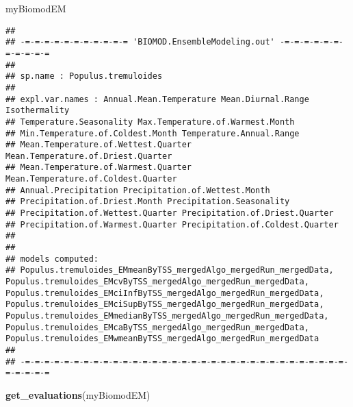 \documentclass[]{article}
\newenvironment{Shaded}{\begin{snugshade}}{\end{snugshade}}
\newcommand{\KeywordTok}[1]{\textcolor[rgb]{0.13,0.29,0.53}{\textbf{#1}}}
\newcommand{\NormalTok}[1]{#1}
\begin{document}
\begin{Shaded}
\begin{Highlighting}[]
\NormalTok{myBiomodEM}
\end{Highlighting}
\end{Shaded}

\begin{verbatim}
## 
## -=-=-=-=-=-=-=-=-=-=-= 'BIOMOD.EnsembleModeling.out' -=-=-=-=-=-=-=-=-=-=-=
## 
## sp.name : Populus.tremuloides
## 
## expl.var.names : Annual.Mean.Temperature Mean.Diurnal.Range Isothermality 
## Temperature.Seasonality Max.Temperature.of.Warmest.Month 
## Min.Temperature.of.Coldest.Month Temperature.Annual.Range 
## Mean.Temperature.of.Wettest.Quarter Mean.Temperature.of.Driest.Quarter 
## Mean.Temperature.of.Warmest.Quarter Mean.Temperature.of.Coldest.Quarter 
## Annual.Precipitation Precipitation.of.Wettest.Month 
## Precipitation.of.Driest.Month Precipitation.Seasonality 
## Precipitation.of.Wettest.Quarter Precipitation.of.Driest.Quarter 
## Precipitation.of.Warmest.Quarter Precipitation.of.Coldest.Quarter
## 
## 
## models computed: 
## Populus.tremuloides_EMmeanByTSS_mergedAlgo_mergedRun_mergedData, Populus.tremuloides_EMcvByTSS_mergedAlgo_mergedRun_mergedData, Populus.tremuloides_EMciInfByTSS_mergedAlgo_mergedRun_mergedData, Populus.tremuloides_EMciSupByTSS_mergedAlgo_mergedRun_mergedData, Populus.tremuloides_EMmedianByTSS_mergedAlgo_mergedRun_mergedData, Populus.tremuloides_EMcaByTSS_mergedAlgo_mergedRun_mergedData, Populus.tremuloides_EMwmeanByTSS_mergedAlgo_mergedRun_mergedData
## 
## -=-=-=-=-=-=-=-=-=-=-=-=-=-=-=-=-=-=-=-=-=-=-=-=-=-=-=-=-=-=-=-=-=-=-=-=-=-=
\end{verbatim}

\begin{Shaded}
\begin{Highlighting}[]
\KeywordTok{get_evaluations}\NormalTok{(myBiomodEM)}
\end{Highlighting}
\end{Shaded}
\end{document}

